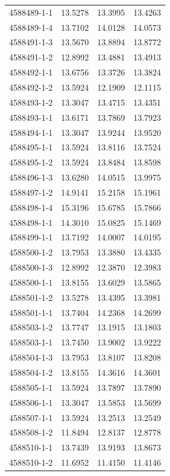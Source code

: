 \begin{longtable}{lrrr}
4588489-1-1 & 13.5278 & 13.3995 & 13.4263 \\
4588489-1-4 & 13.7102 & 14.0128 & 14.0573 \\
4588491-1-3 & 13.5670 & 13.8894 & 13.8772 \\
4588491-1-2 & 12.8992 & 13.4881 & 13.4913 \\
4588492-1-1 & 13.6756 & 13.3726 & 13.3824 \\
4588492-1-2 & 13.5924 & 12.1909 & 12.1115 \\
4588493-1-2 & 13.3047 & 13.4715 & 13.4351 \\
4588493-1-1 & 13.6171 & 13.7869 & 13.7923 \\
4588494-1-1 & 13.3047 & 13.9244 & 13.9520 \\
4588495-1-1 & 13.5924 & 13.8116 & 13.7524 \\
4588495-1-2 & 13.5924 & 13.8484 & 13.8598 \\
4588496-1-3 & 13.6280 & 14.0515 & 13.9975 \\
4588497-1-2 & 14.9141 & 15.2158 & 15.1961 \\
4588498-1-4 & 15.3196 & 15.6785 & 15.7866 \\
4588498-1-1 & 14.3010 & 15.0825 & 15.1469 \\
4588499-1-1 & 13.7192 & 14.0007 & 14.0195 \\
4588500-1-2 & 13.7953 & 13.3880 & 13.4335 \\
4588500-1-3 & 12.8992 & 12.3870 & 12.3983 \\
4588500-1-1 & 13.8155 & 13.6029 & 13.5865 \\
4588501-1-2 & 13.5278 & 13.4395 & 13.3981 \\
4588501-1-1 & 13.7404 & 14.2368 & 14.2699 \\
4588503-1-2 & 13.7747 & 13.1915 & 13.1803 \\
4588503-1-1 & 13.7450 & 13.9002 & 13.9222 \\
4588504-1-3 & 13.7953 & 13.8107 & 13.8208 \\
4588504-1-2 & 13.8155 & 14.3616 & 14.3601 \\
4588505-1-1 & 13.5924 & 13.7897 & 13.7890 \\
4588506-1-1 & 13.3047 & 13.5853 & 13.5699 \\
4588507-1-1 & 13.5924 & 13.2513 & 13.2549 \\
4588508-1-2 & 11.8494 & 12.8137 & 12.8778 \\
4588510-1-1 & 13.7439 & 13.9193 & 13.8673 \\
4588510-1-2 & 11.6952 & 11.4150 & 11.4146 \\

\end{longtable}
